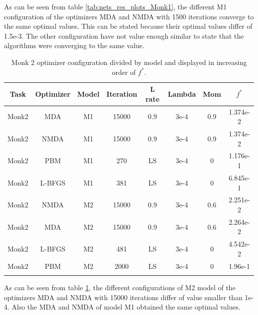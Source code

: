 As can be seen from table \ref{tab:nets_res_plots_Monk1}, the different M1 configuration of the optimizers MDA and NMDA with 1500 iterations converge to the same optimal values. This can be stated because their optimal values differ of 1.5e-3. The other configuration have not value enough similar to state that the algorithms were converging to the same value.


\begin{longtable}{|c|c|c|c|c|c|c|c|}
	\hline
	\centering
	\textbf{Task}&\textbf{Optimizer}&\textbf{Model} &\textbf{Iteration} & \textbf{L rate} & \multicolumn{1}{l|}{\textbf{Lambda}} & \textbf{Mom} & \textbf{$f^{*}$} \\ \hline 
	Monk2 & MDA & M1 & 15000 & 0.9 & 3e-4  & 0.9 & 1.374e-2 		\\
	Monk2 & NMDA & M1 & 15000 & 0.9 & 3e-4  & 0.9 &  1.374e-2 	\\
	Monk2 & PBM & M1 & 270 & LS & 3e-4  & 0 & 1.176e-1  				\\
	Monk2 & L-BFGS & M1 & 381 & LS & 3e-4  & 0 & 6.845e-1 			\\
	Monk2 & NMDA & M2 & 15000 & 0.9 & 3e-4  & 0.6 & 2.251e-2 	\\
	Monk2 & MDA & M2 & 15000 & 0.9 & 3e-4  & 0.6 & 2.264e-2 		\\
	Monk2 & L-BFGS & M2 & 481 & LS & 3e-4  & 0 & 4.542e-2 			\\
	Monk2 & PBM & M2 & 2000 & LS & 3e-4  & 0 & 1.96e-1 				\\
	\hline
	\caption{Monk 2 optimizer configuration divided by model and displayed in increasing order of $f^*$.}
	\label{tab:nets_res_plots_Monk2}
\end{longtable}

As can be seen from table \ref{tab:nets_res_plots_Monk2}, the different configurations of M2 model of the optimizers MDA and NMDA with 15000 iterations differ of value smaller than 1e-4. Also the MDA and NMDA of model M1 obtained the same optimal values.



